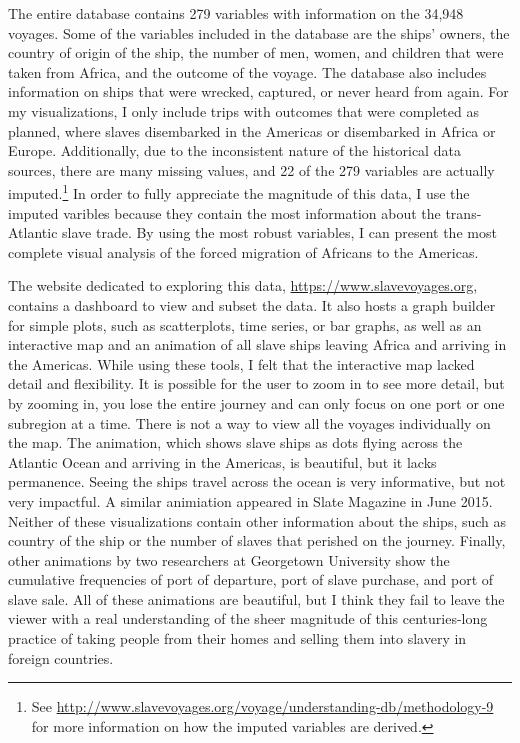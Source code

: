 \documentclass[DIV=calc, paper=a4, fontsize=10pt, twocolumn]{scrartcl}\usepackage[]{graphicx}\usepackage[]{color}
\begin{document}
\par The entire database contains 279 variables with information on the 34,948 voyages. Some of the variables included in the database are the ships' owners, the country of origin of the ship, the number of men, women, and children that were taken from Africa, and the outcome of the voyage. The database also includes information on ships that were wrecked, captured, or never heard from again. For my visualizations, I only include trips with outcomes that were completed as planned, where slaves disembarked in the Americas or disembarked in Africa or Europe.  Additionally, due to the inconsistent nature of the historical data sources, there are many missing values, and 22 of the 279 variables are actually imputed.\footnote{See \url{http://www.slavevoyages.org/voyage/understanding-db/methodology-9} for more information on how the imputed variables are derived.} In order to fully appreciate the magnitude of this data, I use the imputed varibles because they contain the most information about the trans-Atlantic slave trade. By using the most robust variables, I can present the most complete visual analysis of the forced migration of Africans to the Americas.  

\par The website dedicated to exploring this data, \url{https://www.slavevoyages.org}, contains a dashboard to view and subset the data. It also hosts a graph builder for simple plots, such as scatterplots, time series, or bar graphs, as well as an interactive map and an animation of all slave ships leaving Africa and arriving in the Americas. While using these tools, I felt that the interactive map lacked detail and flexibility. It is possible for the user to zoom in to see more detail, but by zooming in, you lose the entire journey and can only focus on one port or one subregion at a time. There is not a way to view all the voyages individually on the map. The animation, which shows slave ships as dots flying across the Atlantic Ocean and arriving in the Americas, is beautiful, but it lacks permanence. Seeing the ships travel across the ocean is very informative, but not very impactful. A similar animiation appeared in Slate Magazine in June 2015.%
Neither of these visualizations contain other information about the ships, such as country of the ship or the number of slaves that perished on the journey. Finally, other animations by two researchers at Georgetown University show the cumulative frequencies of port of departure, port of slave purchase, and port of slave sale.%
All of these animations are beautiful, but I think they fail to leave the viewer with a real understanding of the sheer magnitude of this centuries-long practice of taking people from their homes and selling them into slavery in foreign countries.
\end{document}
